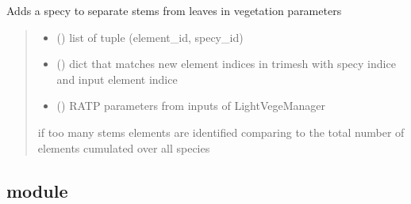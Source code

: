 \documentclass[letterpaper,10pt,english]{sphinxmanual}
\begin{document}
\begin{fulllineitems}
\label{\detokenize{reference:stems.manage_stems_for_ratp}}
\pysigstartsignatures
{}
\pysigstopsignatures
\sphinxAtStartPar
Adds a specy to separate stems from leaves in vegetation parameters
\begin{quote}\begin{description}
\begin{itemize}
\item {} 
\sphinxAtStartPar
{} () \textendash{} list of tuple (element\_id, specy\_id)

\item {} 
\sphinxAtStartPar
{} () \textendash{} dict that matches new element indices in trimesh with specy indice and
input element indice

\item {} 
\sphinxAtStartPar
{} () \textendash{} RATP parameters from inputs of LightVegeManager

\end{itemize}

\sphinxAtStartPar
{} \textendash{} if too many stems elements are identified comparing to the total number of elements cumulated over all species

\end{description}\end{quote}

\end{fulllineitems}



\subsection{ module}
\label{\detokenize{reference:module-sun}}\label{\detokenize{reference:sun-module}}
\end{document}

